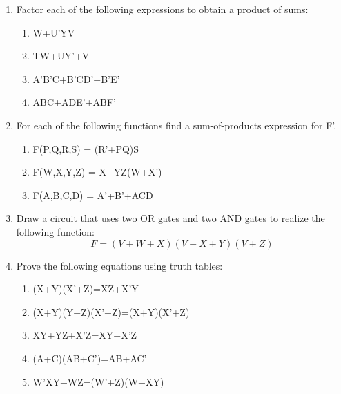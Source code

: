 \documentclass[12pt]{article}
\begin{document}
\begin{enumerate}
     \addtocounter{enumi}{1}\item Factor each of the following expressions to obtain a product of sums:
     \begin{enumerate}
         \item W+U'YV
         \item TW+UY'+V
         \item A'B'C+B'CD'+B'E'
         \item ABC+ADE'+ABF'
     \end{enumerate}
     \addtocounter{enumi}{1}\item For each of the following functions find a sum-of-products expression for F'.
     \begin{enumerate}
         \item F(P,Q,R,S) = (R'+PQ)S
         \item F(W,X,Y,Z) = X+YZ(W+X')
         \item F(A,B,C,D) = A'+B'+ACD
     \end{enumerate}
     \addtocounter{enumi}{1}\item Draw a circuit that uses two OR gates and two AND gates to realize the following function:
        \[F=(V+W+X)(V+X+Y)(V+Z)\]
    \addtocounter{enumi}{1}\item Prove the following equations using truth tables:
    \begin{enumerate}
        \item (X+Y)(X'+Z)=XZ+X'Y
        \item (X+Y)(Y+Z)(X'+Z)=(X+Y)(X'+Z)
        \item XY+YZ+X'Z=XY+X'Z
        \item (A+C)(AB+C')=AB+AC'
        \item W'XY+WZ=(W'+Z)(W+XY)
    \end{enumerate}
      
\end{enumerate}
\end{document}
